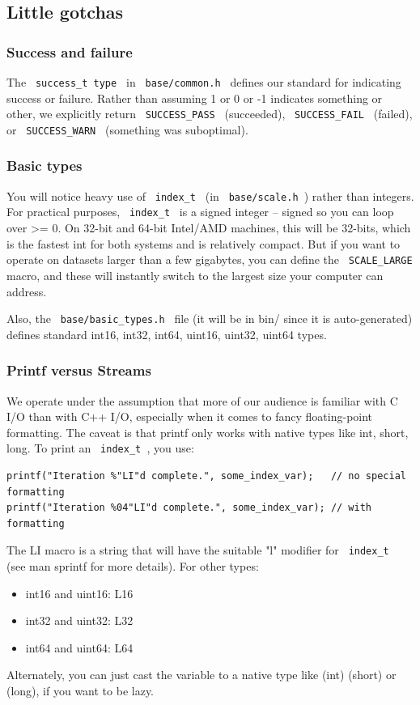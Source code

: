 \documentclass[letter]{report}
\begin{document}
\subsection{Little gotchas}

\subsubsection{Success and failure}

The \verb= success_t type = in \verb= base/common.h = defines our standard for indicating success or failure. Rather than assuming 1 or 0 or -1 indicates something or other, we explicitly return \verb= SUCCESS_PASS = (succeeded), \verb= SUCCESS_FAIL = (failed), or \verb= SUCCESS_WARN = (something was suboptimal).

\subsubsection{Basic types}

You will notice heavy use of \verb= index_t = (in \verb= base/scale.h =) rather than integers. For practical purposes, \verb= index_t = is a signed integer -- signed so you can loop over >= 0. On 32-bit and 64-bit Intel/AMD machines, this will be 32-bits, which is the fastest int for both systems and is relatively compact. But if you want to operate on datasets larger than a few gigabytes, you can define the \verb= SCALE_LARGE = macro, and these will instantly switch to the largest size your computer can address.

Also, the \verb= base/basic_types.h = file (it will be in bin/ since it is auto-generated) defines standard int16, int32, int64, uint16, uint32, uint64 types.

\subsubsection{Printf versus Streams}

We operate under the assumption that more of our audience is familiar with C I/O than with C++ I/O, especially when it comes to fancy floating-point formatting. The caveat is that printf only works with native types like int, short, long. To print an \verb= index_t =, you use:
\begin{verbatim}
printf("Iteration %"LI"d complete.", some_index_var);   // no special formatting
printf("Iteration %04"LI"d complete.", some_index_var); // with formatting
\end{verbatim}
The LI macro is a string that will have the suitable "l" modifier for \verb= index_t = (see man sprintf for more details). For other types:
\begin {itemize}
\item int16 and uint16: L16
\item int32 and uint32: L32
\item int64 and uint64: L64 
\end{itemize}
Alternately, you can just cast the variable to a native type like (int) (short) or (long), if you want to be lazy.
\end{document}
